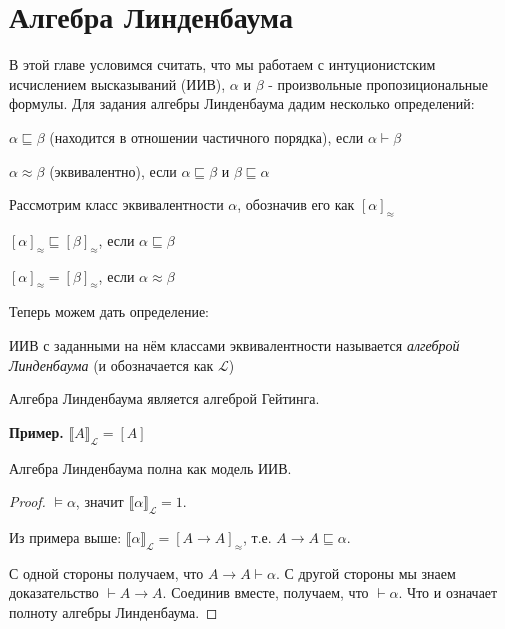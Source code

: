 \section{Алгебра Линденбаума}

В этой главе условимся считать, что мы работаем с 
интуционистским исчислением высказываний (ИИВ), $\alpha$ и $\beta$ - 
произвольные пропозициональные формулы.
Для задания алгебры Линденбаума дадим несколько определений:

\begin{definition}
$\alpha \sqsubseteq \beta$ (находится в отношении частичного порядка), 
если $\alpha \vdash \beta$
\end{definition}

\begin{definition}
$\alpha \approx \beta$ (эквивалентно), если $\alpha \sqsubseteq \beta$
и $\beta \sqsubseteq \alpha$
\end{definition}

Рассмотрим класс эквивалентности $\alpha$, обозначив его как $[\alpha]_{\approx}$

\begin{definition}
$[\alpha]_{\approx} \sqsubseteq [\beta]_{\approx}$, если $\alpha \sqsubseteq \beta$
\end{definition}

\begin{definition}
$[\alpha]_{\approx} = [\beta]_{\approx}$, если $\alpha \approx \beta$
\end{definition}


Теперь можем дать определение:
\begin{definition}
ИИВ с заданными на нём классами эквивалентности называется \emph{алгеброй Линденбаума}
(и обозначается как $\mathcal{L}$)
\end{definition}

\begin{lemma}
Алгебра Линденбаума является алгеброй Гейтинга.
\end{lemma}

\textbf{Пример.} ${\llbracket A \rrbracket}_{\mathcal{L}} = [A]$

\begin{consequence}
Алгебра Линденбаума полна как модель ИИВ.
\end{consequence}
\begin{proof}
$\models \alpha$, значит ${\llbracket \alpha \rrbracket}_{\mathcal{L}} = 1$.

Из примера выше: ${\llbracket \alpha \rrbracket}_{\mathcal{L}} = 
	[A \rightarrow A]_{\approx}$, т.е. $A \rightarrow A \sqsubseteq \alpha$.
	
С одной стороны получаем, что $A \rightarrow A \vdash \alpha$. С другой стороны мы 
знаем доказательство $\vdash A \rightarrow A$. Соединив вместе, получаем, что $\vdash \alpha$. Что и означает полноту алгебры Линденбаума.
\end{proof}

